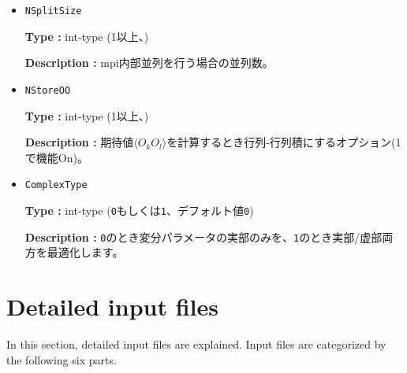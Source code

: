 \begin{itemize}
{\bf Type :} int-type 

{\bf Description :} 乱数の初期seed。\verb|RndSeed|

 \item \verb|NSplitSize|

{\bf Type :} int-type (1以上、)

{\bf Description :} mpi内部並列を行う場合の並列数。

\item \verb|NStoreOO|

{\bf Type :} int-type (1以上、)

{\bf Description :} 期待値$\langle O_k O_l \rangle$を計算するとき行列-行列積にするオプション(1で機能On)。
 
\item  \verb|ComplexType|
  
  {\bf Type :} int-type (\verb|0|もしくは\verb|1|、デフォルト値\verb|0|)

  {\bf Description :} \verb|0|のとき変分パラメータの実部のみを、\verb|1|のとき実部/虚部両方を最適化します。

\end{itemize}


\newpage
\section{Detailed input files}
\label{Ch:HowToExpert}

In this section, detailed input files are explained. Input files are categorized by the following six parts.

